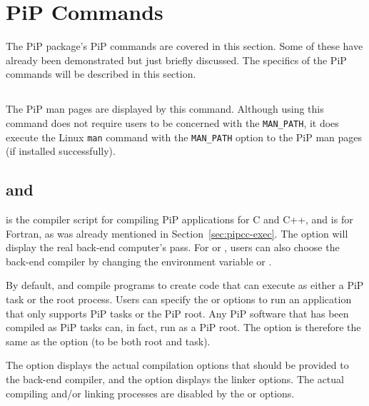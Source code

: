
\section{PiP Commands}

The PiP package's PiP commands are covered in this section. Some of
these have already been demonstrated but just briefly discussed. The
specifics of the PiP commands will be described in this section. 

\subsection{}\label{sec:pip-man}

The PiP man pages are displayed by this command. Although using this
command does not require users to be concerned with the {\tt MAN_PATH}, it
does execute the Linux {\tt man} command with the {\tt MAN_PATH}
option to the PiP man pages (if installed successfully).

\subsection{ and }

 is the compiler script for compiling PiP applications
for C and C++, and  is for Fortran, as was already
mentioned in Section~\ref{sec:pipcc-exec}. 
The  option will display the real
back-end computer's pass. For  or , users
can also choose the back-end compiler by changing the environment
variable  or .

By default,  and  compile programs to
create code that can execute as either a PiP task or the root
process. Users can specify the  or
options to run an application that only 
supports PiP tasks or the PiP root. Any PiP software that has been
compiled as PiP tasks can, in fact, run as a PiP root. The
option is therefore the same as the 
option (to be both root and task).

The  option displays the actual compilation
options that 
should be provided to the back-end compiler, and the
option displays the linker options. The actual compiling and/or
linking processes are disabled by the
 or  
options.

